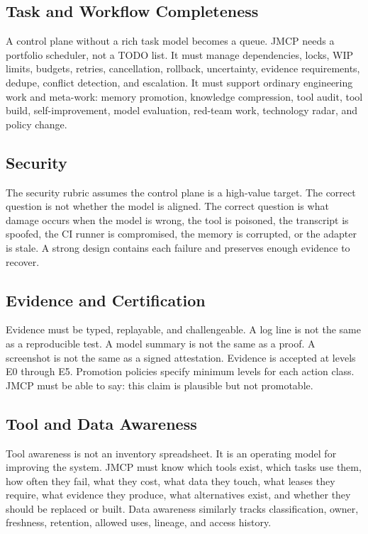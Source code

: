 \documentclass[journal,onecolumn]{IEEEtran}
\begin{document}
\subsection{Task and Workflow Completeness}
A control plane without a rich task model becomes a queue. JMCP needs a portfolio scheduler, not a TODO list. It must manage dependencies, locks, WIP limits, budgets, retries, cancellation, rollback, uncertainty, evidence requirements, dedupe, conflict detection, and escalation. It must support ordinary engineering work and meta-work: memory promotion, knowledge compression, tool audit, tool build, self-improvement, model evaluation, red-team work, technology radar, and policy change.

\subsection{Security}
The security rubric assumes the control plane is a high-value target. The correct question is not whether the model is aligned. The correct question is what damage occurs when the model is wrong, the tool is poisoned, the transcript is spoofed, the CI runner is compromised, the memory is corrupted, or the adapter is stale. A strong design contains each failure and preserves enough evidence to recover.

\subsection{Evidence and Certification}
Evidence must be typed, replayable, and challengeable. A log line is not the same as a reproducible test. A model summary is not the same as a proof. A screenshot is not the same as a signed attestation. Evidence is accepted at levels E0 through E5. Promotion policies specify minimum levels for each action class. JMCP must be able to say: this claim is plausible but not promotable.

\subsection{Tool and Data Awareness}
Tool awareness is not an inventory spreadsheet. It is an operating model for improving the system. JMCP must know which tools exist, which tasks use them, how often they fail, what they cost, what data they touch, what leases they require, what evidence they produce, what alternatives exist, and whether they should be replaced or built. Data awareness similarly tracks classification, owner, freshness, retention, allowed uses, lineage, and access history.
\end{document}
